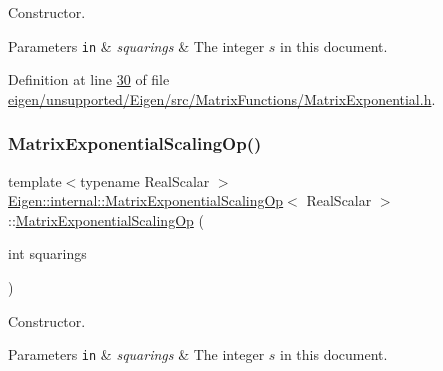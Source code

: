 Constructor. 


\begin{DoxyParams}[1]{Parameters}
\mbox{\tt in}  & {\em squarings} & The integer $ s $ in this document. \\
\hline
\end{DoxyParams}


Definition at line \hyperlink{eigen_2unsupported_2_eigen_2src_2_matrix_functions_2_matrix_exponential_8h_source_l00030}{30} of file \hyperlink{eigen_2unsupported_2_eigen_2src_2_matrix_functions_2_matrix_exponential_8h_source}{eigen/unsupported/\+Eigen/src/\+Matrix\+Functions/\+Matrix\+Exponential.\+h}.

\mbox{\label{struct_eigen_1_1internal_1_1_matrix_exponential_scaling_op_afb0f3ee7d324e315d1e1233f70110438}} 
\subsubsection{\texorpdfstring{Matrix\+Exponential\+Scaling\+Op()}{MatrixExponentialScalingOp()}\hspace{0.1cm}{\footnotesize\ttfamily [2/2]}}
{\footnotesize\ttfamily template$<$typename Real\+Scalar $>$ \\
\hyperlink{struct_eigen_1_1internal_1_1_matrix_exponential_scaling_op}{Eigen\+::internal\+::\+Matrix\+Exponential\+Scaling\+Op}$<$ Real\+Scalar $>$\+::\hyperlink{struct_eigen_1_1internal_1_1_matrix_exponential_scaling_op}{Matrix\+Exponential\+Scaling\+Op} (\begin{DoxyParamCaption}\item[{int}]{squarings }\end{DoxyParamCaption})\hspace{0.3cm}{\ttfamily [inline]}}



Constructor. 


\begin{DoxyParams}[1]{Parameters}
\mbox{\tt in}  & {\em squarings} & The integer $ s $ in this document. \\
\hline
\end{DoxyParams}


